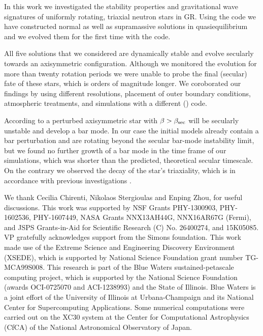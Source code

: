 \documentclass[twocolumn,superscriptaddress,showpacs,prd,aps,amsmath,amssymb,nofootinbib]{revtex4-1}
\newcommand{\GB}{\beta}
\begin{document}
In this work we investigated the stability properties and
gravitational wave signatures of uniformly rotating, triaxial neutron
stars in GR.  Using the \cocal{} code we have constructed normal as
well as supramassive solutions in quasiequilibrium and we evolved them
for the first time with the \illinois{} code.

All five solutions that we considered are dynamically stable and
evolve secularly towards an axisymmetric configuration. Although we
monitored the evolution for more than twenty rotation periods we were
unable to probe the final (secular) fate of these stars, which is
orders of magnitude longer.  We coroborated our findings by using
different resolutions, placement of outer boundary conditions,
atmospheric treatments, and simulations with a different (\whisky{})
code.

According to \cite{SF98} a perturbed axisymmetric star with
$\GB>\GB_{\rm sec}$ will be secularly unstable and develop a bar
mode. In our case the initial models already contain a bar
perturbation and are rotating beyond the secular bar-mode instability
limit, but we found no further growth of a bar mode 
in the time frame of our simulations, which was shorter than the
predicted, theoretical secular timescale. On the contrary
we observed the decay of the star's triaxiality, which is in
accordance with previous investigations \cite{DLSS04}.




\acknowledgments 
We thank Cecilia Chirenti, Nikolaos Stergioulas and Enping Zhou, for 
useful discussions. This work was supported by 
NSF Grants PHY-1300903, PHY-1602536, PHY-1607449,
NASA Grants NNX13AH44G, NNX16AR67G (Fermi), and
JSPS Grants-in-Aid for Scientific Research (C) No. 26400274, and 15K05085.
VP gratefully acknowledges support from the Simons foundation. 
This work made use of the Extreme
Science and Engineering Discovery Environment (XSEDE), which is
supported by National Science Foundation grant number TG-MCA99S008.
This research is part of the Blue Waters sustained-petascale computing
project, which is supported by the National Science Foundation (awards
OCI-0725070 and ACI-1238993) and the State of Illinois. Blue Waters is
a joint effort of the University of Illinois at Urbana-Champaign and
its National Center for Supercomputing Applications. 
Some numerical computations were carried out on the XC30 system at the 
Center for Computational Astrophysics (CfCA) of the National Astronomical 
Observatory of Japan.
\end{document}
